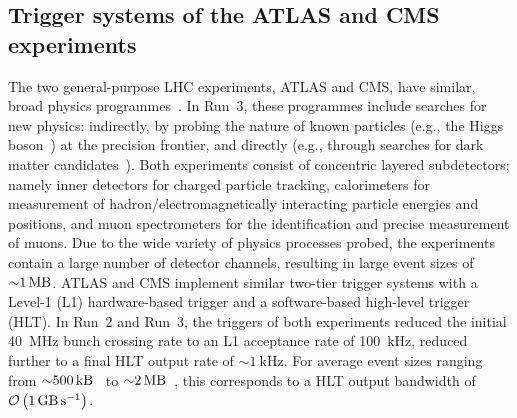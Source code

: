 \subsection{Trigger systems of the ATLAS and CMS experiments}

The two general-purpose LHC experiments, ATLAS and CMS, have similar, broad physics programmes~\cite{ATLASMachine,collaboration2008cms}. In Run~3, these programmes include searches for new physics: indirectly, by probing the nature of known particles (e.g.,  the Higgs boson~\cite{snowmass-higgs}) at the precision frontier, and directly (e.g.,  through searches for dark matter candidates~\cite{snowmass-darkmatter}). Both experiments consist of concentric layered subdetectors; namely inner detectors for charged particle tracking, calorimeters for measurement of hadron/electromagnetically interacting particle energies and positions, and muon spectrometers for the identification and precise measurement of muons. Due to the wide variety of physics processes probed, the experiments contain a large number of detector channels, resulting in large event sizes of ${\sim}\SI{1}{\mega\byte}$. ATLAS and CMS implement similar two-tier trigger systems with a Level-1 (L1) hardware-based trigger and a software-based high-level trigger (HLT). In Run~2 and Run~3, the triggers of both experiments reduced the initial \SI{40}{\mega\hertz} bunch crossing rate to an L1 acceptance rate of \SI{100}{\kilo\hertz}, reduced further to a final HLT output rate of ${\sim}\SI{1}{\kilo\hertz}$. For average event sizes ranging from ${\sim}\SI{500}{\kilo\byte}$~\cite{ATLASRun3EventBuilder} to ${\sim}\SI{2}{\mega\byte}$~\cite{cmsRun3EventBuilder}, this corresponds to a HLT output bandwidth of $\mathcal{O}\left(\SI{1}{\giga\byte\per\second}\right)$.
